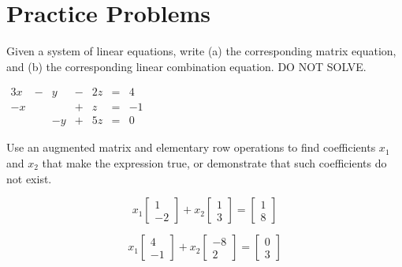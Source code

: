 \documentclass{ximera}
\begin{document}
\section*{Practice Problems}
 \begin{problem}\label{prob:systomatrixeq}
Given a system of linear equations, write (a) the corresponding matrix equation, and (b) the corresponding linear combination equation.  DO NOT SOLVE.
\begin{center}
$\begin{array}{ccccccc}
       3x&- &y &- &2z&= &4 \\
     -x& & &+ &z&= &-1 \\
     & &-y &+ &5z&=&0
    \end{array}$
\end{center}
\end{problem}
\begin{problem}
Use an augmented matrix and elementary row operations to find coefficients $x_1$ and $x_2$ that make the expression true, or demonstrate that such coefficients do not exist.
 \begin{problem}\label{prob:lincombeq1}

    $$ x_1\begin{bmatrix}
           1\\
           -2
         \end{bmatrix}+ x_2\begin{bmatrix}
           1\\
           3
         \end{bmatrix}=\begin{bmatrix}
           1\\
           8
         \end{bmatrix}$$
         \end{problem}



\begin{problem}\label{prob:lincombeq2}

 $$ x_1\begin{bmatrix}
           4\\
           -1
         \end{bmatrix}+ x_2\begin{bmatrix}
           -8\\
           2
         \end{bmatrix}=\begin{bmatrix}
           0\\
           3
         \end{bmatrix}$$

  \end{problem}

\end{problem}
 
\end{document}
